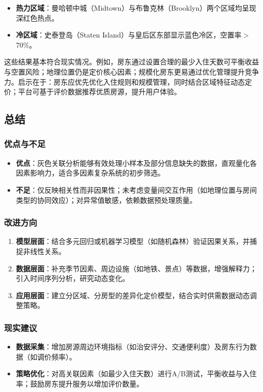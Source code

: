\documentclass[12pt]{article}
\begin{document}
\begin{CJK}{UTF8}{gbsn}
	\begin{itemize}
		\item \textbf{热力区域}：曼哈顿中城（Midtown）与布鲁克林（Brooklyn）两个区域均呈现深红色热点。
		\item \textbf{冷区域}：史泰登岛（Staten Island）与皇后区东部显示蓝色冷区，空置率$>$70\%。
	\end{itemize}
	
	这些结果基本符合现实情况。例如，房东通过设置合理的最少入住天数可平衡收益与空置风险；地理位置仍是定价核心因素；规模化房东更易通过优化管理提升竞争力。启示在于：房东应优先优化入住规则和规模管理，同时结合区域特征动态定价；平台可基于评价数据推荐优质房源，提升用户体验。
	
	\subsection{总结}
	
	\subsubsection{优点与不足}
	\begin{itemize}
		\item \textbf{优点}：灰色关联分析能够有效处理小样本及部分信息缺失的数据，直观量化各因素影响力，适合多因素复杂系统的初步筛选。
		\item \textbf{不足}：仅反映相关性而非因果性；未考虑变量间交互作用（如地理位置与房间类型的协同效应）；对异常值敏感，依赖数据预处理质量。
	\end{itemize}
	
	\subsubsection{改进方向}
	\begin{enumerate}
		\item \textbf{模型层面}：结合多元回归或机器学习模型（如随机森林）验证因果关系，并捕捉非线性关系。
		\item \textbf{数据层面}：补充季节因素、周边设施（如地铁、景点）等数据，增强解释力；引入时间序列分析，研究动态变化。
		\item \textbf{应用层面}：建立分区域、分房型的差异化定价模型，结合实时供需数据动态调整策略。
	\end{enumerate}
	
	\subsubsection{现实建议}
	\begin{itemize}
		\item \textbf{数据采集}：增加房源周边环境指标（如治安评分、交通便利度）及房东行为数据（如调价频率）。
		\item \textbf{策略优化}：对高关联因素（如最少入住天数）进行A/B测试，平衡收益与入住率；鼓励房东提升服务以增加评价数量。
	\end{itemize}
	

\end{CJK}
\end{document}
